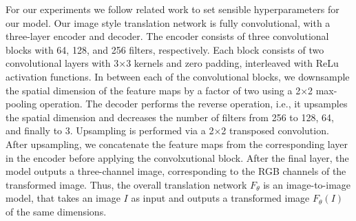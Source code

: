 For our experiments we follow related work \cite{unet,dslr-quality,raw-to-raw}
to set sensible hyperparameters for our model. Our image style translation
network is fully convolutional, with a three-layer encoder and decoder. The encoder consists of three convolutional blocks with 64, 128, and 256 filters, respectively. Each block consists of two convolutional layers with 3×3 kernels and zero padding, interleaved with ReLu activation functions.
In between each of the convolutional blocks, we downsample the spatial dimension
of the feature maps by a factor of two using a 2×2 max-pooling operation. The
decoder performs the reverse operation, i.e., it upsamples the spatial
dimension and decreases the number of filters from 256 to 128, 64, and finally
to 3. Upsampling is performed via a 2×2 transposed convolution. After
upsampling, we concatenate the feature maps from the corresponding layer in the
encoder before applying the convolxutional block. After the final layer,
the model outputs a three-channel image, corresponding to the RGB channels of
the transformed image.  Thus, the overall translation network $F_{\theta}$
is an image-to-image model, that takes an image $I$ as input and outputs a
transformed image $F_{\theta}(I)$ of the same dimensions. 


